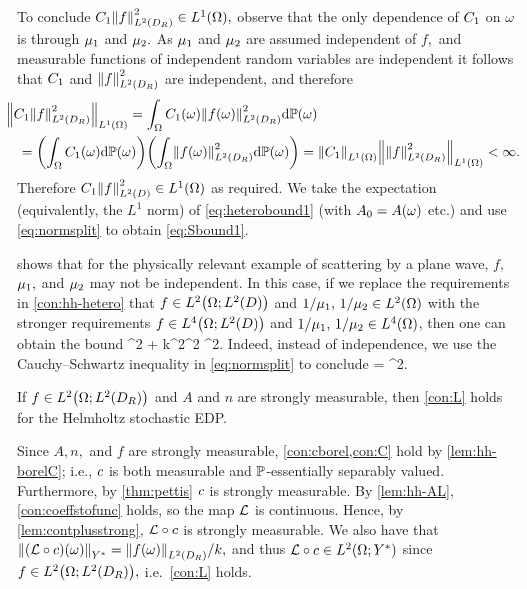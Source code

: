 To conclude $\Co\NLtDR{f}^2 \in \LoO,$ observe that the only dependence of $C_{1}$ on $\omega$ is through $\mu_{1}$ and $\mu_{2}.$ As $\mu_{1}$ and $\mu_{2}$ are assumed independent of $f,$ and measurable functions of independent random variables are independent \cite[p.236]{Lo:77} it follows that $C_{1}$ and $\NLtDR{f}^2$ are independent, and therefore
\begin{align}\nonumber
&\hspace{-2ex}\NLoO{\Co\NLtDR{f}^2} = \int_\Omega \Co(\omega) \NLtDR{f(\omega)}^2 \dd\PP(\omega) 
\\ &= \mleft(\int_\Omega \Co(\omega) \dd\PP(\omega)\mright)\mleft(\int_\Omega \NLtDR{f(\omega)}^2 \dd\PP(\omega)\mright)= \NLoO{\Co}\NLoO{\NLtDR{f}^2} < \infty.\label{eq:normsplit}
\end{align}
Therefore $\Co\NLtD{f}^2 \in \LoO$ as required. We take the expectation (equivalently, the $L^1$ norm) of \eqref{eq:heterobound1} (with $A_{0} = A(\omega)$ etc.) and use \eqref{eq:normsplit} to obtain \eqref{eq:Sbound1}.
\epf

\label{rem:notindep}
 shows that for the physically relevant example of scattering by a plane wave, $f,$ $\mu_{1},$ and $\mu_{2}$ may not be independent. In this case, if we replace the requirements in \cref{con:hh-hetero} that $f \in \LtOLtD$ and $1/\muo,\,1/\mut \in \LtO$ with the stronger requirements $f \in \LfOLtD$ and $1/\muo,\,1/\mut \in \LfO$, then one can obtain the bound
\beqs
{}^2 + k^2^2\leq \NLtO{\Co} ^2.
\eeqs
Indeed, instead of independence, we use the Cauchy--Schwartz inequality in \eqref{eq:normsplit} to conclude
\beqs
{}  \leq \NLtO{\Co} = \NLtO{\Co} ^2.
\eeqs
\ere

\label{lem:hh-L}
If $f \in \LtOLtDR$ and $A$ and $n$ are strongly measurable, then \cref{con:L} holds for the Helmholtz stochastic EDP.
\ele

Since $A,n,$ and $f$ are strongly measurable, \cref{con:cborel,con:C} hold by \cref{lem:hh-borelC}; i.e., $c$ is both measurable and $\mathbb P$-essentially separably valued. Furthermore, by \cref{thm:pettis} $c$ is strongly measurable. By \cref{lem:hh-AL}, \cref{con:coeffstofunc} holds, so the map $\mathcal L$ is continuous. Hence, by \cref{lem:contplusstrong}, $\mathcal L\circ c$ is strongly measurable. We also have that
$\NYs{\mleft(\rhs\circ\coeff\mright)(\omega)} = \NLtDR{f(\omega)}/k,$
and thus $\rhs\circ\coeff \in \LtOYs$ since $f \in \LtOLtDR,$ i.e.~\cref{con:L} holds.
\epf

